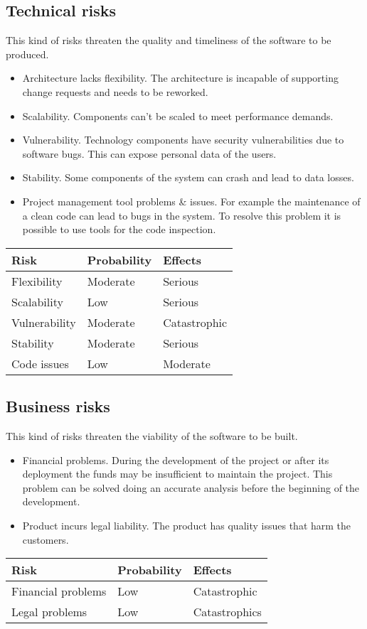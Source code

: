 \subsection{Technical risks}
This kind of risks threaten the quality and timeliness of the software to be produced.

\begin{itemize}
    \item Architecture lacks flexibility. The architecture is incapable of supporting change requests and needs to be reworked.
    \item Scalability. Components can't be scaled to meet performance demands. 
    \item Vulnerability. Technology components have security vulnerabilities due to software bugs. This can expose personal data of the users.
    \item Stability. Some components of the system can crash and lead to data losses.
    \item Project management tool problems \& issues. For example the maintenance of a clean code can lead to bugs in the system. To resolve this problem it is possible to use tools for the code inspection.
\end{itemize}

\begin{table}[h]
\centering
    \begin{tabular}{|l|l|l|}
        \hline
        Risk & Probability & Effects \\
        \hline
        Flexibility & Moderate & Serious \\
        \hline
        Scalability & Low & Serious\\
        \hline
        Vulnerability & Moderate & Catastrophic \\
        \hline
        Stability & Moderate & Serious\\
        \hline
        Code issues & Low & Moderate \\
        \hline
    \end{tabular}
\end{table}


\subsection{Business risks}
This kind of risks threaten the viability of the software to be built.

\begin{itemize}
    \item Financial problems. During the development of the project or after its deployment the funds may be insufficient to maintain the project. This problem can be solved doing an accurate analysis before the beginning of the development.
    \item Product incurs legal liability. The product has quality issues that harm the customers. 
\end{itemize}

\begin{table}[h]
\centering
    \begin{tabular}{|l|l|l|}
        \hline
        Risk & Probability & Effects \\
        \hline
        Financial problems & Low & Catastrophic \\
        \hline
        Legal problems & Low & Catastrophics \\
        \hline
    \end{tabular}
\end{table}


